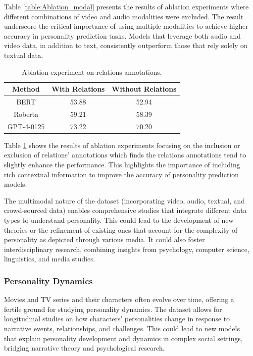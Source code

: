 Table \ref{table:Ablation_modal} presents the results of ablation experiments where different combinations of video and audio modalities were excluded. The result underscore the critical importance of using multiple modalities to achieve higher accuracy in personality prediction tasks. Models that leverage both audio and video data, in addition to text, consistently outperform those that rely solely on textual data. 
\begin{table}[ht]
    \centering
    \small
    \begin{tabular}{ccc}
        \hline
        \textbf{Method} & \textbf{With Relations} & \textbf{Without Relations} \\
        \hline
        BERT & 53.88 & 52.94 \\
        \hline
        Roberta & 59.21 & 58.39 \\
        \hline
        GPT-4-0125 & 73.22 & 70.20 \\  
        \hline
    \end{tabular}
    \caption{Ablation experiment on relations annotations.}
    \label{table:Ablation_relationship}
\end{table}

Table \ref{table:Ablation_relationship} shows the results of ablation experiments focusing on the inclusion or exclusion of relations' annotations which finds the relations annotations tend to slightly enhance the performance. This highlights the importance of including rich contextual information to improve the accuracy of personality prediction models. 


The multimodal nature of the dataset (incorporating video, audio, textual, and crowd-sourced data) enables comprehensive studies that integrate different data types to understand personality. This could lead to the development of new theories or the refinement of existing ones that account for the complexity of personality as depicted through various media. It could also foster interdisciplinary research, combining insights from psychology, computer science, linguistics, and media studies.
\subsubsection{Personality Dynamics}

Movies and TV series and their characters often evolve over time, offering a fertile ground for studying personality dynamics. The dataset allows for longitudinal studies on how characters' personalities change in response to narrative events, relationships, and challenges. This could lead to new models that explain personality development and dynamics in complex social settings, bridging narrative theory and psychological research. 

